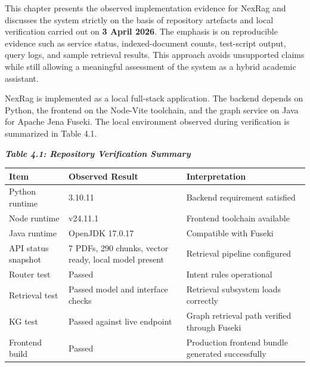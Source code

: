 \newpage
{}
\label{chap:results-discussion}

\label{sec:results-introduction}

\fontsize{12}{14}\selectfont

This chapter presents the observed implementation evidence for NexRag and discusses the system strictly on the basis of repository artefacts and local verification carried out on \textbf{3 April 2026}. The emphasis is on reproducible evidence such as service status, indexed-document counts, test-script output, query logs, and sample retrieval results. This approach avoids unsupported claims while still allowing a meaningful assessment of the system as a hybrid academic assistant.

\label{sec:results-environment}

NexRag is implemented as a local full-stack application. The backend depends on Python, the frontend on the Node-Vite toolchain, and the graph service on Java for Apache Jena Fuseki. The local environment observed during verification is summarized in Table 4.1.

\begin{center}
\normalsize \textbf{\textit{Table 4.1: Repository Verification Summary}}
\end{center}

\begingroup
\footnotesize
\renewcommand{\arraystretch}{1.12}
\setlength{\tabcolsep}{4pt}
\begin{table}[H]
\centering
\label{tab:repository-verification}
\begin{tabularx}{\textwidth}{|>{\RaggedRight\arraybackslash\hspace{0pt}}X|>{\RaggedRight\arraybackslash\hspace{0pt}}X|>{\RaggedRight\arraybackslash\hspace{0pt}}X|}
\hline
\textbf{Item} & \textbf{Observed Result} & \textbf{Interpretation} \\ \hline
Python runtime & 3.10.11 & Backend requirement satisfied \\ \hline
Node runtime & v24.11.1 & Frontend toolchain available \\ \hline
Java runtime & OpenJDK 17.0.17 & Compatible with Fuseki \\ \hline
API status snapshot & 7 PDFs, 290 chunks, vector ready, local model present & Retrieval pipeline configured \\ \hline
Router test & Passed & Intent rules operational \\ \hline
Retrieval test & Passed model and interface checks & Retrieval subsystem loads correctly \\ \hline
KG test & Passed against live endpoint & Graph retrieval path verified through Fuseki \\ \hline
Frontend build & Passed & Production frontend bundle generated successfully \\ \hline
\end{tabularx}
\end{table}
\endgroup

